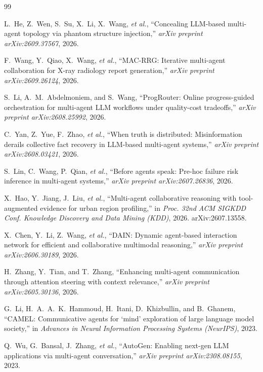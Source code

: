 \begin{thebibliography}{99}
\setlength{\itemsep}{2pt}

L.~He, Z.~Wen, S.~Su, X.~Li, X.~Wang, \emph{et al.},
``Concealing LLM-based multi-agent topology via phantom structure injection,''
\emph{arXiv preprint arXiv:2609.37567}, 2026.

F.~Wang, Y.~Qiao, X.~Wang, \emph{et al.},
``MAC-RRG: Iterative multi-agent collaboration for X-ray radiology report generation,''
\emph{arXiv preprint arXiv:2609.26124}, 2026.

S.~Li, A.~M.~Abdelmoniem, and S.~Wang,
``ProgRouter: Online progress-guided orchestration for multi-agent LLM workflows under quality-cost tradeoffs,''
\emph{arXiv preprint arXiv:2608.25992}, 2026.

C.~Yan, Z.~Yue, F.~Zhao, \emph{et al.},
``When truth is distributed: Misinformation derails collective fact recovery in LLM-based multi-agent systems,''
\emph{arXiv preprint arXiv:2608.03421}, 2026.

S.~Lin, C.~Wang, P.~Qian, \emph{et al.},
``Before agents speak: Pre-hoc failure risk inference in multi-agent systems,''
\emph{arXiv preprint arXiv:2607.26836}, 2026.

X.~Hao, Y.~Jiang, J.~Liu, \emph{et al.},
``Multi-agent collaborative reasoning with tool-augmented evidence for urban region profiling,''
in \emph{Proc. 32nd ACM SIGKDD Conf. Knowledge Discovery and Data Mining (KDD)}, 2026. arXiv:2607.13558.

X.~Chen, Y.~Li, Z.~Wang, \emph{et al.},
``DAIN: Dynamic agent-based interaction network for efficient and collaborative multimodal reasoning,''
\emph{arXiv preprint arXiv:2606.30189}, 2026.

H.~Zhang, Y.~Tian, and T.~Zhang,
``Enhancing multi-agent communication through attention steering with context relevance,''
\emph{arXiv preprint arXiv:2605.30136}, 2026.

G.~Li, H.~A.~A.~K.~Hammoud, H.~Itani, D.~Khizbullin, and B.~Ghanem,
``CAMEL: Communicative agents for `mind' exploration of large language model society,''
in \emph{Advances in Neural Information Processing Systems (NeurIPS)}, 2023.

Q.~Wu, G.~Bansal, J.~Zhang, \emph{et al.},
``AutoGen: Enabling next-gen LLM applications via multi-agent conversation,''
\emph{arXiv preprint arXiv:2308.08155}, 2023.


\end{thebibliography}
